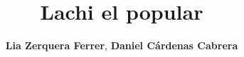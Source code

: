 \documentclass[sn-mathphys,Numbered]{sn-jnl}%
\theoremstyle{thmstyleone}%
\theoremstyle{thmstyletwo}%
\theoremstyle{thmstylethree}%
\begin{document}
\title[Lachi el popular]{Lachi el popular}


\author{\textbf{Lia Zerquera Ferrer},
\textbf{Daniel C\'ardenas Cabrera}}





% 
% 
% 
\end{document}

